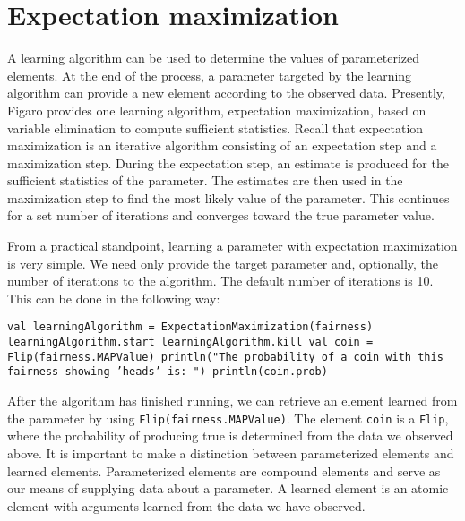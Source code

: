 \section{Expectation maximization}

A learning algorithm can be used to determine the values of parameterized elements. At the end of the process, a parameter targeted by the learning algorithm can provide a new element according to the observed data. Presently, Figaro provides one learning algorithm, expectation maximization, based on variable elimination to compute sufficient statistics. Recall that expectation maximization is an iterative algorithm consisting of an expectation step and a maximization step. During the expectation step, an estimate is produced for the sufficient statistics of the parameter. The estimates are then used in the maximization step to find the most likely value of the parameter. This continues for a set number of iterations and converges toward the true parameter value.

From a practical standpoint, learning a parameter with expectation maximization is very simple. We need only provide the target parameter and, optionally, the number of iterations to the algorithm. The default number of iterations is 10. This can be done in the following way:

\begin{flushleft}
\texttt{val learningAlgorithm = ExpectationMaximization(fairness)
\newline learningAlgorithm.start
\newline learningAlgorithm.kill
\newline 
\newline val coin = Flip(fairness.MAPValue)
\newline println("The probability of a coin with this fairness showing
'heads' is: ")
\newline println(coin.prob)
}
\end{flushleft}

After the algorithm has finished running, we can retrieve an element learned from the parameter by using \texttt{Flip(fairness.MAPValue)}. The element \texttt{coin} is a \texttt{Flip}, where the probability of producing true is determined from the data we observed above. It is important to make a distinction between parameterized elements and learned elements. Parameterized elements are compound elements and serve as our means of supplying data about a parameter. A learned element is an atomic element with arguments learned from the data we have observed.


